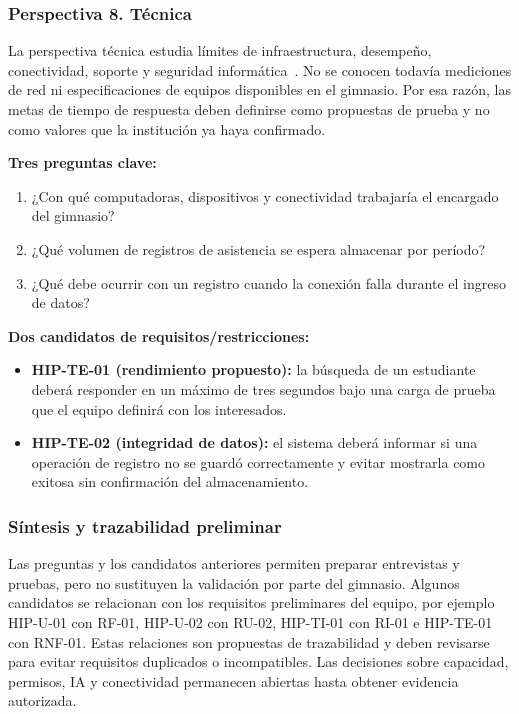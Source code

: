 \subsubsection{Perspectiva 8. Técnica}
La perspectiva técnica estudia límites de infraestructura, desempeño, conectividad, soporte y seguridad informática~\cite{pohl2025}. No se conocen todavía mediciones de red ni especificaciones de equipos disponibles en el gimnasio. Por esa razón, las metas de tiempo de respuesta deben definirse como propuestas de prueba y no como valores que la institución ya haya confirmado.

\textbf{Tres preguntas clave:}
\begin{enumerate}
\item ¿Con qué computadoras, dispositivos y conectividad trabajaría el encargado del gimnasio?
\item ¿Qué volumen de registros de asistencia se espera almacenar por período?
\item ¿Qué debe ocurrir con un registro cuando la conexión falla durante el ingreso de datos?
\end{enumerate}
\textbf{Dos candidatos de requisitos/restricciones:}
\begin{itemize}
\item \textbf{HIP-TE-01 (rendimiento propuesto):} la búsqueda de un estudiante deberá responder en un máximo de tres segundos bajo una carga de prueba que el equipo definirá con los interesados.
\item \textbf{HIP-TE-02 (integridad de datos):} el sistema deberá informar si una operación de registro no se guardó correctamente y evitar mostrarla como exitosa sin confirmación del almacenamiento.
\end{itemize}

\subsubsection{Síntesis y trazabilidad preliminar}
Las preguntas y los candidatos anteriores permiten preparar entrevistas y pruebas, pero no sustituyen la validación por parte del gimnasio. Algunos candidatos se relacionan con los requisitos preliminares del equipo, por ejemplo HIP-U-01 con RF-01, HIP-U-02 con RU-02, HIP-TI-01 con RI-01 e HIP-TE-01 con RNF-01. Estas relaciones son propuestas de trazabilidad y deben revisarse para evitar requisitos duplicados o incompatibles. Las decisiones sobre capacidad, permisos, IA y conectividad permanecen abiertas hasta obtener evidencia autorizada.

